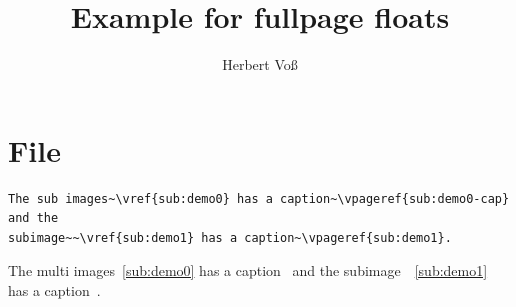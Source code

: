 \documentclass[twocolumn]{scrartcl}
\begin{document}
\title{Example for fullpage floats}
\author{Herbert Voß}
\maketitle

\tableofcontents

\blinddocument

\section{File \texttt{\jobname}}

\begin{lstlisting}
The sub images~\vref{sub:demo0} has a caption~\vpageref{sub:demo0-cap} and the
subimage~~\vref{sub:demo1} has a caption~\vpageref{sub:demo1}.
\end{lstlisting}

The multi images~\vref{sub:demo0} has a caption~ and the
subimage~~\vref{sub:demo1} has a caption~.
\end{document}
